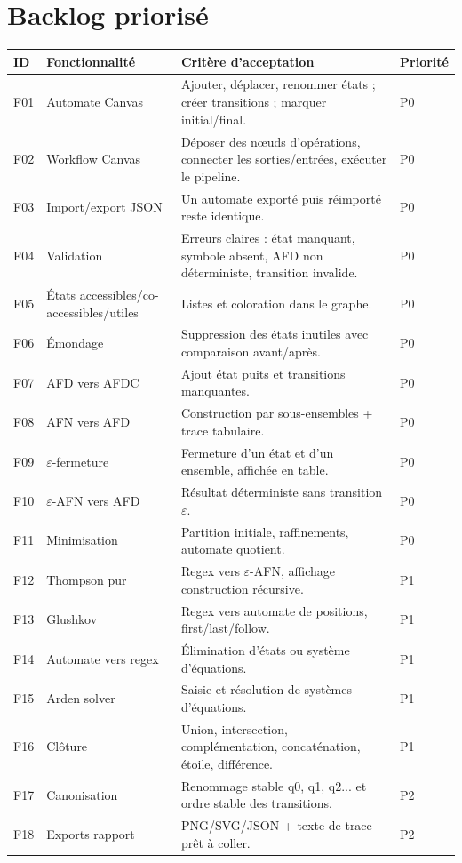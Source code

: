 \documentclass[11pt,a4paper]{report}
\newcommand{\eps}{\ensuremath{\varepsilon}}
\begin{document}
\section{Backlog priorisé}
\begin{longtable}{p{}p{}p{}p{}}
\toprule
\textbf{ID} & \textbf{Fonctionnalité} & \textbf{Critère d'acceptation} & \textbf{Priorité}\\
\midrule
F01 & Automate Canvas & Ajouter, déplacer, renommer états ; créer transitions ; marquer initial/final. & P0\\
F02 & Workflow Canvas & Déposer des nœuds d'opérations, connecter les sorties/entrées, exécuter le pipeline. & P0\\
F03 & Import/export JSON & Un automate exporté puis réimporté reste identique. & P0\\
F04 & Validation & Erreurs claires : état manquant, symbole absent, AFD non déterministe, transition invalide. & P0\\
F05 & États accessibles/co-accessibles/utiles & Listes et coloration dans le graphe. & P0\\
F06 & Émondage & Suppression des états inutiles avec comparaison avant/après. & P0\\
F07 & AFD vers AFDC & Ajout état puits et transitions manquantes. & P0\\
F08 & AFN vers AFD & Construction par sous-ensembles + trace tabulaire. & P0\\
F09 & \eps-fermeture & Fermeture d'un état et d'un ensemble, affichée en table. & P0\\
F10 & \eps-AFN vers AFD & Résultat déterministe sans transition \eps. & P0\\
F11 & Minimisation & Partition initiale, raffinements, automate quotient. & P0\\
F12 & Thompson pur & Regex vers \eps-AFN, affichage construction récursive. & P1\\
F13 & Glushkov & Regex vers automate de positions, first/last/follow. & P1\\
F14 & Automate vers regex & Élimination d'états ou système d'équations. & P1\\
F15 & Arden solver & Saisie et résolution de systèmes d'équations. & P1\\
F16 & Clôture & Union, intersection, complémentation, concaténation, étoile, différence. & P1\\
F17 & Canonisation & Renommage stable q0, q1, q2... et ordre stable des transitions. & P2\\
F18 & Exports rapport & PNG/SVG/JSON + texte de trace prêt à coller. & P2\\
\bottomrule
\end{longtable}
\end{document}
